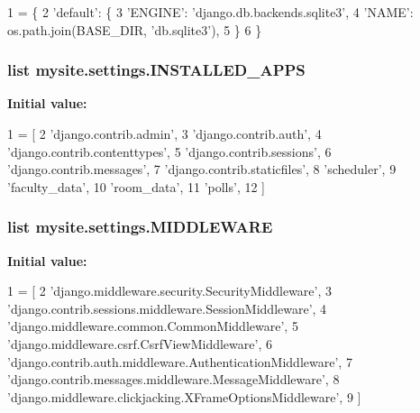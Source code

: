 \begin{DoxyCode}
1 = \{
2     \textcolor{stringliteral}{'default'}: \{
3         \textcolor{stringliteral}{'ENGINE'}: \textcolor{stringliteral}{'django.db.backends.sqlite3'},
4         \textcolor{stringliteral}{'NAME'}: os.path.join(BASE\_DIR, \textcolor{stringliteral}{'db.sqlite3'}),
5     \}
6 \}
\end{DoxyCode}
\hypertarget{namespacemysite_1_1settings_ae0300504ffe212a8082806286d6fe36b}{
\subsubsection[{I\-N\-S\-T\-A\-L\-L\-E\-D\-\_\-\-A\-P\-P\-S}]{\setlength{\rightskip}{0pt plus 5cm}list mysite.\-settings.\-I\-N\-S\-T\-A\-L\-L\-E\-D\-\_\-\-A\-P\-P\-S}}\label{namespacemysite_1_1settings_ae0300504ffe212a8082806286d6fe36b}
{\bfseries Initial value\-:}
\begin{DoxyCode}
1 = [
2     \textcolor{stringliteral}{'django.contrib.admin'},
3     \textcolor{stringliteral}{'django.contrib.auth'},
4     \textcolor{stringliteral}{'django.contrib.contenttypes'},
5     \textcolor{stringliteral}{'django.contrib.sessions'},
6     \textcolor{stringliteral}{'django.contrib.messages'},
7     \textcolor{stringliteral}{'django.contrib.staticfiles'},
8     \textcolor{stringliteral}{'scheduler'},
9     \textcolor{stringliteral}{'faculty\_data'},
10     \textcolor{stringliteral}{'room\_data'},
11     \textcolor{stringliteral}{'polls'},
12 ]
\end{DoxyCode}
\hypertarget{namespacemysite_1_1settings_a90df4fc7c17f07da22241f9ceb21f3b9}{
\subsubsection[{M\-I\-D\-D\-L\-E\-W\-A\-R\-E}]{\setlength{\rightskip}{0pt plus 5cm}list mysite.\-settings.\-M\-I\-D\-D\-L\-E\-W\-A\-R\-E}}\label{namespacemysite_1_1settings_a90df4fc7c17f07da22241f9ceb21f3b9}
{\bfseries Initial value\-:}
\begin{DoxyCode}
1 = [
2     \textcolor{stringliteral}{'django.middleware.security.SecurityMiddleware'},
3     \textcolor{stringliteral}{'django.contrib.sessions.middleware.SessionMiddleware'},
4     \textcolor{stringliteral}{'django.middleware.common.CommonMiddleware'},
5     \textcolor{stringliteral}{'django.middleware.csrf.CsrfViewMiddleware'},
6     \textcolor{stringliteral}{'django.contrib.auth.middleware.AuthenticationMiddleware'},
7     \textcolor{stringliteral}{'django.contrib.messages.middleware.MessageMiddleware'},
8     \textcolor{stringliteral}{'django.middleware.clickjacking.XFrameOptionsMiddleware'},
9 ]
\end{DoxyCode}
